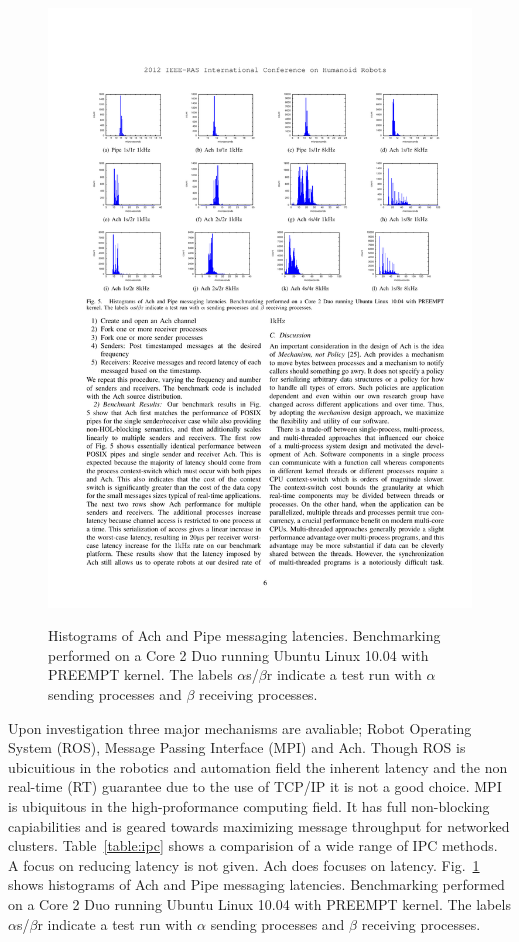 \begin{figure}[thpb]
  \centering
      \includegraphics[width=1.0\columnwidth]{./hubo-ach/pix/dantam2012robustAchTiming.pdf}\\
\caption{Histograms of Ach and Pipe messaging latencies. Benchmarking performed on a Core 2 Duo running Ubuntu Linux 10.04 with PREEMPT
kernel. The labels $\alpha$s/$\beta$r indicate a test run with $\alpha$ sending processes and $\beta$ receiving processes\cite{ach}.}
\label{fig:ach-timing}
\end{figure}




Upon investigation three major mechanisms are avaliable; Robot Operating System (ROS)\cite{ros}, Message Passing Interface (MPI)\cite{Gropp:1999:UMP:330577} and Ach\cite{ach}.
Though ROS is ubicuitious in the robotics and automation field the inherent latency and the non real-time (RT) guarantee due to the use of TCP/IP it is not a good choice.
MPI is ubiquitous in the high-proformance computing field.  It has full non-blocking capiabilities and is geared towards maximizing message throughput for networked clusters\cite{ach}.
Table~\ref{table:ipc} shows a comparision of a wide range of IPC methods.
A focus on reducing latency is not given.
Ach does focuses on latency.
Fig.~\ref{fig:ach-timing} shows histograms of Ach and Pipe messaging latencies. Benchmarking performed on a Core 2 Duo running Ubuntu Linux 10.04 with PREEMPT
kernel. The labels $\alpha$s/$\beta$r indicate a test run with $\alpha$ sending processes and $\beta$ receiving processes.



